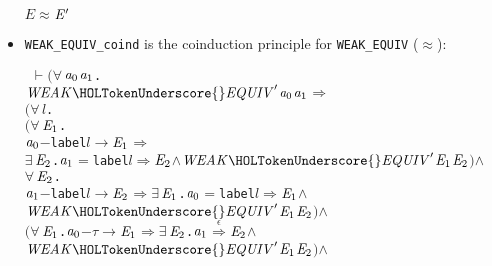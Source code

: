 \documentclass[GCNS]{yincog}
\renewcommand{\HOLinline}[1]{\mbox{\textup{\texttt{#1}}}}
\renewcommand{\HOLConst}[1]{\texttt{#1}}
\renewcommand{\HOLBoundVar}[1]{\ensuremath{\mathit{#1}}}
\renewcommand{\HOLFreeVar}[1]{\ensuremath{\mathit{#1}}}
\renewcommand{\HOLSymConst}[1]{#1}
\renewcommand{\HOLTokenConj}{\ensuremath{\wedge}}
\renewcommand{\HOLTokenExists}{\ensuremath{\exists \,}}
\renewcommand{\HOLTokenForall}{\ensuremath{\forall \,}}
\renewcommand{\HOLTokenTurnstile}{\ensuremath{\:\:\vdash}}
\theoremstyle{remark}
\theoremstyle{theorem}
\theoremstyle{remark}
\newcommand{\HOLTokenWeakEQ}{$\approx$}
\newcommand{\HOLTokenEPS}{$\overset{\epsilon}{\Longrightarrow}$}
\newcommand{\HOLTokenTransBegin}{$-$}
\newcommand{\HOLTokenTransEnd}{$\rightarrow$\xspace}
\newcommand{\HOLTokenWeakTransBegin}{$=$}
\newcommand{\HOLTokenWeakTransEnd}{$\Rightarrow$\xspace}
\renewcommand{\HOLTokenImp}{\ensuremath{\Longrightarrow}}
\newcommand{\wbvtex}{\approx}
\begin{document}
\begin{itemize}
\begin{alltt}
   \HOLFreeVar{E} \HOLSymConst{\HOLTokenWeakEQ} \ensuremath{\HOLFreeVar{E}\sp{\prime}}
\end{alltt}
%
\item \texttt{WEAK\_EQUIV\_coind} is the coinduction principle for
\HOLinline{\HOLConst{WEAK\_EQUIV}} ($\wbvtex $):
%
\begin{alltt}
\HOLTokenTurnstile{} \ensuremath{(}\HOLSymConst{\HOLTokenForall{}}\ensuremath{\HOLBoundVar{a}\sb{\mathrm{0}}} \ensuremath{\HOLBoundVar{a}\sb{\mathrm{1}}}.
        \ensuremath{\HOLFreeVar{WEAK\HOLTokenUnderscore{}EQUIV}\sp{\prime}} \ensuremath{\HOLBoundVar{a}\sb{\mathrm{0}}} \ensuremath{\HOLBoundVar{a}\sb{\mathrm{1}}} \HOLSymConst{\HOLTokenImp{}}
        \ensuremath{(}\HOLSymConst{\HOLTokenForall{}}\HOLBoundVar{l}.
             \ensuremath{(}\HOLSymConst{\HOLTokenForall{}}\ensuremath{\HOLBoundVar{E}\sb{\mathrm{1}}}.
                  \ensuremath{\HOLBoundVar{a}\sb{\mathrm{0}}} \HOLTokenTransBegin\HOLConst{label} \HOLBoundVar{l}\HOLTokenTransEnd \ensuremath{\HOLBoundVar{E}\sb{\mathrm{1}}} \HOLSymConst{\HOLTokenImp{}}
                  \HOLSymConst{\HOLTokenExists{}}\ensuremath{\HOLBoundVar{E}\sb{\mathrm{2}}}. \ensuremath{\HOLBoundVar{a}\sb{\mathrm{1}}} \HOLTokenWeakTransBegin\HOLConst{label} \HOLBoundVar{l}\HOLTokenWeakTransEnd \ensuremath{\HOLBoundVar{E}\sb{\mathrm{2}}} \HOLSymConst{\HOLTokenConj{}} \ensuremath{\HOLFreeVar{WEAK\HOLTokenUnderscore{}EQUIV}\sp{\prime}} \ensuremath{\HOLBoundVar{E}\sb{\mathrm{1}}} \ensuremath{\HOLBoundVar{E}\sb{\mathrm{2}}}\ensuremath{)} \HOLSymConst{\HOLTokenConj{}}
             \HOLSymConst{\HOLTokenForall{}}\ensuremath{\HOLBoundVar{E}\sb{\mathrm{2}}}.
                 \ensuremath{\HOLBoundVar{a}\sb{\mathrm{1}}} \HOLTokenTransBegin\HOLConst{label} \HOLBoundVar{l}\HOLTokenTransEnd \ensuremath{\HOLBoundVar{E}\sb{\mathrm{2}}} \HOLSymConst{\HOLTokenImp{}} \HOLSymConst{\HOLTokenExists{}}\ensuremath{\HOLBoundVar{E}\sb{\mathrm{1}}}. \ensuremath{\HOLBoundVar{a}\sb{\mathrm{0}}} \HOLTokenWeakTransBegin\HOLConst{label} \HOLBoundVar{l}\HOLTokenWeakTransEnd \ensuremath{\HOLBoundVar{E}\sb{\mathrm{1}}} \HOLSymConst{\HOLTokenConj{}} \ensuremath{\HOLFreeVar{WEAK\HOLTokenUnderscore{}EQUIV}\sp{\prime}} \ensuremath{\HOLBoundVar{E}\sb{\mathrm{1}}} \ensuremath{\HOLBoundVar{E}\sb{\mathrm{2}}}\ensuremath{)} \HOLSymConst{\HOLTokenConj{}}
        \ensuremath{(}\HOLSymConst{\HOLTokenForall{}}\ensuremath{\HOLBoundVar{E}\sb{\mathrm{1}}}. \ensuremath{\HOLBoundVar{a}\sb{\mathrm{0}}} \HOLTokenTransBegin\HOLSymConst{\ensuremath{\tau}}\HOLTokenTransEnd \ensuremath{\HOLBoundVar{E}\sb{\mathrm{1}}} \HOLSymConst{\HOLTokenImp{}} \HOLSymConst{\HOLTokenExists{}}\ensuremath{\HOLBoundVar{E}\sb{\mathrm{2}}}. \ensuremath{\HOLBoundVar{a}\sb{\mathrm{1}}} \HOLSymConst{\HOLTokenEPS} \ensuremath{\HOLBoundVar{E}\sb{\mathrm{2}}} \HOLSymConst{\HOLTokenConj{}} \ensuremath{\HOLFreeVar{WEAK\HOLTokenUnderscore{}EQUIV}\sp{\prime}} \ensuremath{\HOLBoundVar{E}\sb{\mathrm{1}}} \ensuremath{\HOLBoundVar{E}\sb{\mathrm{2}}}\ensuremath{)} \HOLSymConst{\HOLTokenConj{}}

\end{alltt}
\end{itemize}
\end{document}
